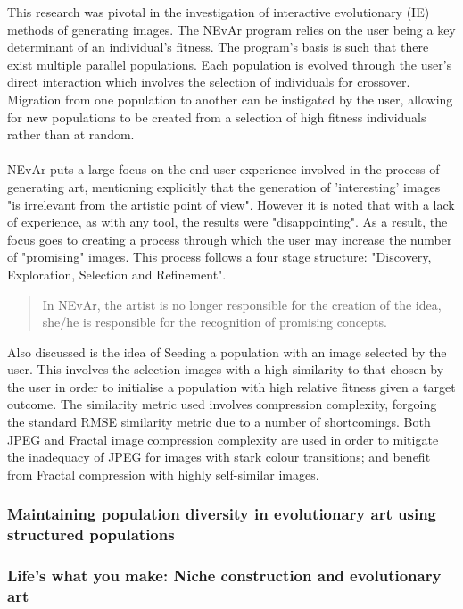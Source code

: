 \documentclass[10pt,a4paper]{article}
\begin{document}
This research was pivotal in the investigation of interactive evolutionary (IE) methods of generating images.
The NEvAr program relies on the user being a key determinant of an individual's fitness.
The program's basis is such that there exist multiple parallel populations.
Each population is evolved through the user's direct interaction which involves the selection of individuals for crossover.
Migration from one population to another can be instigated by the user, allowing for new populations to be created from a selection of high fitness individuals rather than at random.
\\\\
NEvAr puts a large focus on the end-user experience involved in the process of generating art, mentioning explicitly that the generation of 'interesting' images "is irrelevant from the artistic point of view".
However it is noted that with a lack of experience, as with any tool, the results were "disappointing".
As a result, the focus goes to creating a process through which the user may increase the number of "promising" images.
This process follows a four stage structure: "Discovery, Exploration, Selection and Refinement".
\begin{quotation}
In NEvAr, the artist is no longer responsible for the creation of the idea, she/he is responsible for the recognition of promising concepts.
\end{quotation}

Also discussed is the idea of Seeding a population with an image selected by the user.
This involves the selection images with a high similarity to that chosen by the user in order to initialise a population with high relative fitness given a target outcome.
The similarity metric used involves compression complexity, forgoing the standard RMSE similarity metric due to a number of shortcomings.
Both JPEG and Fractal image compression complexity are used in order to mitigate the inadequacy of JPEG for images with stark colour transitions; and benefit from Fractal compression with highly self-similar images.

\subsubsection{Maintaining population diversity in evolutionary art using structured populations \cite{distributed-evolutionary-art}}



\subsubsection{Life’s what you make: Niche construction and evolutionary art \cite{niche-reproduction}}
\end{document}
